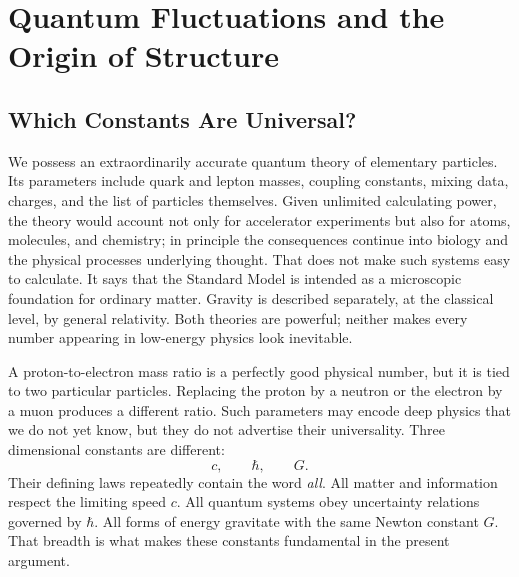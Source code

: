 \chapter{Quantum Fluctuations and the Origin of Structure}


\section{Which Constants Are Universal?}

We possess an extraordinarily accurate quantum theory of elementary particles. Its parameters include quark and lepton masses, coupling constants, mixing data, charges, and the list of particles themselves. Given unlimited calculating power, the theory would account not only for accelerator experiments but also for atoms, molecules, and chemistry; in principle the consequences continue into biology and the physical processes underlying thought. That does not make such systems easy to calculate. It says that the Standard Model is intended as a microscopic foundation for ordinary matter. Gravity is described separately, at the classical level, by general relativity. Both theories are powerful; neither makes every number appearing in low-energy physics look inevitable.

A proton-to-electron mass ratio is a perfectly good physical number, but it is tied to two particular particles. Replacing the proton by a neutron or the electron by a muon produces a different ratio. Such parameters may encode deep physics that we do not yet know, but they do not advertise their universality. Three dimensional constants are different:
\[
c,\qquad \hbar,\qquad G.
\]
Their defining laws repeatedly contain the word \emph{all}. All matter and information respect the limiting speed \(c\). All quantum systems obey uncertainty relations governed by \(\hbar\). All forms of energy gravitate with the same Newton constant \(G\). That breadth is what makes these constants fundamental in the present argument.

